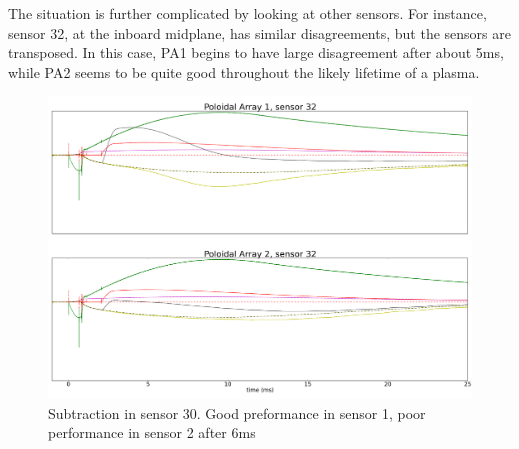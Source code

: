 \documentclass{article}
\begin{document}
\par
The situation is further complicated by looking at other sensors.  For instance, sensor 32, at the inboard midplane, has similar disagreements, but the sensors are transposed.  In this case, PA1 begins to have large disagreement after about 5ms, while PA2 seems to be quite good throughout the likely lifetime of a plasma.
\begin{figure}[h!]
\includegraphics[width = \textwidth]{./RF_subtraction_results_vacuum_sensor_32.png}\caption{Subtraction in sensor 30.  Good preformance in sensor 1, poor performance in sensor 2 after 6ms}
\label{raw_sig}
\end{figure}
\end{document}
